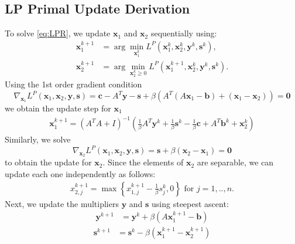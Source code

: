 \documentclass{article}
\begin{document}
\subsection*{LP Primal Update Derivation}
To solve \eqref{eq:LPR}, we update $\mathbf{x}_{1}$ and $\mathbf{x}_{2}$ sequentially using:
\begin{align}
\mathbf{x}_{1}^{k+1} & = \arg \min_{\mathbf{x}_{1}^{k}} L^{P}(\mathbf{x}_{1}^{k},\mathbf{x}_{2}^{k},\mathbf{y}^{k},\mathbf{s}^k),\\
\mathbf{x}_{2}^{k+1} & = \arg \min_{\mathbf{x}_{2}^{k} \geq 0} L^{P}(\mathbf{x}_{1}^{k+1},\mathbf{x}_{2}^{k},\mathbf{y}^{k},\mathbf{s}^k).
\end{align}
Using the 1st order gradient condition
\[
\nabla_{\mathbf{x}_{1}}L^{P}(\mathbf{x}_{1},\mathbf{x}_{2},\mathbf{y}, \mathbf{s})=\mathbf{c}-A^{T}\mathbf{y}-\mathbf{s}+\beta\left(A^{T}\left(A\mathbf{x}_{1}-\mathbf{b}\right)+\left(\mathbf{x}_{1}-\mathbf{x}_{2}\right)\right) = \mathbf{0}
\]
we obtain the update step for $\mathbf{x}_{1}$
\begin{align}\label{eq:x1_primal_update_app}
\mathbf{x}_{1}^{k+1} = \left(A^{T}A+I\right)^{-1}\left(\frac{1}{\beta}A^{T}\mathbf{y}^k+\frac{1}{\beta}\mathbf{s}^k-\frac{1}{\beta}\mathbf{c}+A^{T}\mathbf{b}^k+\mathbf{x}_{2}^k\right)
\end{align}
Similarly, we solve
\[
\nabla_{\mathbf{x}_{2}}L^{P}(\mathbf{x}_{1},\mathbf{x}_{2},\mathbf{y}, \mathbf{s})=\mathbf{s}+\beta\left(\mathbf{x}_{2}-\mathbf{x}_{1}\right) = \mathbf{0}
\]
to obtain the update for $\mathbf{x}_{2}$. Since the elements of $\mathbf{x}_{2}$ are separable, we can update each one independently as follows:
\begin{align}
{x}_{2,j}^{k+1} = \max\left\{ {x}_{1,j}^{k+1}-\frac{1}{\beta}{s}_j^k,0\right\} \text{ for $j = 1,..,n$}.
\end{align}
Next, we update the multipliers $\mathbf{y}$ and $\mathbf{s}$ using steepest ascent:
\begin{align}\label{eq:y_primal_update_app}
\mathbf{y}^{k+1} &= \mathbf{y}^{k} + \beta (A \mathbf{x}_1^{k+1}  - \mathbf{b}) 
\end{align}
\begin{align}\label{eq:s_primal_update_app}
\mathbf{s}^{k+1} &= \mathbf{s}^{k}  - \beta  (\mathbf{x}_1^{k+1}  -\mathbf{x}_2^{k+1} )
\end{align}


\end{document}
